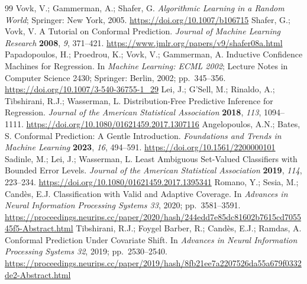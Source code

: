 \begin{thebibliography}{99}
Vovk, V.; Gammerman, A.; Shafer, G.
\emph{Algorithmic Learning in a Random World}; Springer: New York, 2005.
\url{https://doi.org/10.1007/b106715}
Shafer, G.; Vovk, V.
A Tutorial on Conformal Prediction.
\emph{Journal of Machine Learning Research} \textbf{2008}, \emph{9},
371--421.
\url{https://www.jmlr.org/papers/v9/shafer08a.html}
Papadopoulos, H.; Proedrou, K.; Vovk, V.; Gammerman, A.
Inductive Confidence Machines for Regression.
In \emph{Machine Learning: ECML 2002}; Lecture Notes in Computer Science 2430;
Springer: Berlin, 2002; pp.~345--356.
\url{https://doi.org/10.1007/3-540-36755-1_29}
Lei, J.; G'Sell, M.; Rinaldo, A.; Tibshirani, R.J.; Wasserman, L.
Distribution-Free Predictive Inference for Regression.
\emph{Journal of the American Statistical Association} \textbf{2018},
\emph{113}, 1094--1111.
\url{https://doi.org/10.1080/01621459.2017.1307116}
Angelopoulos, A.N.; Bates, S.
Conformal Prediction: A Gentle Introduction.
\emph{Foundations and Trends in Machine Learning} \textbf{2023}, \emph{16},
494--591.
\url{https://doi.org/10.1561/2200000101}
Sadinle, M.; Lei, J.; Wasserman, L.
Least Ambiguous Set-Valued Classifiers with Bounded Error Levels.
\emph{Journal of the American Statistical Association} \textbf{2019},
\emph{114}, 223--234.
\url{https://doi.org/10.1080/01621459.2017.1395341}
Romano, Y.; Sesia, M.; Cand\`es, E.J.
Classification with Valid and Adaptive Coverage.
In \emph{Advances in Neural Information Processing Systems 33}, 2020;
pp.~3581--3591.
\url{https://proceedings.neurips.cc/paper/2020/hash/244edd7e85dc81602b7615cd705545f5-Abstract.html}
Tibshirani, R.J.; Foygel Barber, R.; Cand\`es, E.J.; Ramdas, A.
Conformal Prediction Under Covariate Shift.
In \emph{Advances in Neural Information Processing Systems 32}, 2019;
pp.~2530--2540.
\url{https://proceedings.neurips.cc/paper/2019/hash/8fb21ee7a2207526da55a679f0332de2-Abstract.html}


\end{thebibliography}
